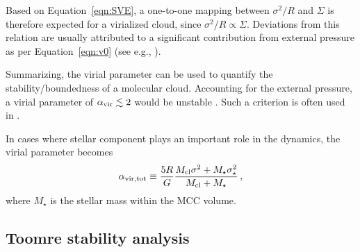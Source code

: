 \IfFileExists{emulateapjlegacy.cls}{\documentclass[iop]{emulateapjlegacy}}{\documentclass[iop]{emulateapj}}
\begin{document}
Based on Equation~\ref{eqn:SVE}, a one-to-one mapping between $\sigma^2/R$ and $\Sigma$ is therefore expected for a virialized cloud, since $\sigma^2/R\propto\Sigma$. Deviations from this relation are usually attributed to a significant contribution from external pressure as per Equation~\ref{eqn:v0} (see e.g., \citealt{Heyer09a, Hughes10a, Hughes13b, Meidt13a}).

Summarizing, the virial parameter can be used to quantify the stability/boundedness of 
    a molecular cloud.
Accounting for the external pressure, a virial parameter of $\alpha_{\rm vir}\lesssim2$ would be unstable \citep{bertoldi:1992}.
%
Such a criterion is often used in \obs \citep[see e.g., ][]{Kauffmann17b}. 

In cases where stellar component plays an important role in the dynamics, the virial parameter becomes
\begin{equation}
\alpha_{\rm vir, tot} \equiv \frac{5 R}{G} \frac{M_{\rm cl} \sigma^2 + M_{\star} \sigma_\star^2}
					       {M_{\rm cl} + M_{\star} }\,,
\label{eqn:alpha_tot}
\end{equation}
where $M_\star$ is the stellar mass within the MCC volume.


\subsection{Toomre stability analysis}\label{sec:Q}
\end{document}
